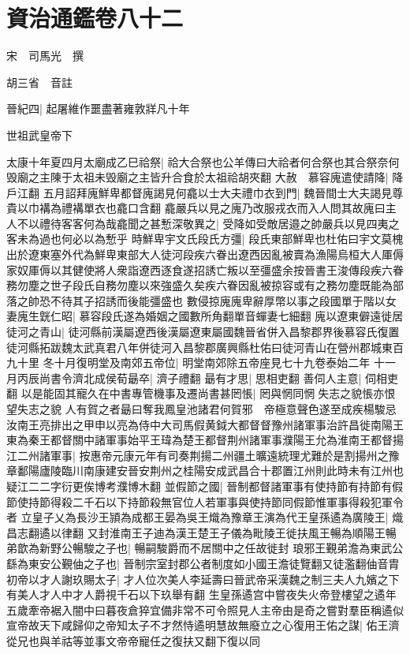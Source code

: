 \chapter{資治通鑑卷八十二}
宋　司馬光　撰

胡三省　音註

晉紀四|{
	起屠維作噩盡著雍敦牂凡十年}


世祖武皇帝下

太康十年夏四月太廟成乙巳祫祭|{
	祫大合祭也公羊傳曰大祫者何合祭也其合祭奈何毁廟之主陳于太祖未毁廟之主皆升合食於太祖祫胡夾翻}
大赦　慕容廆遣使請降|{
	降戶江翻}
五月詔拜廆鮮卑都督廆謁見何龕以士大夫禮巾衣到門|{
	魏晉間士大夫謁見尊貴以巾褠為禮褠單衣也龕口含翻}
龕嚴兵以見之廆乃改服戎衣而入人問其故廆曰主人不以禮待客客何為哉龕聞之甚慙深敬異之|{
	受降如受敵居邉之帥嚴兵以見四夷之客未為過也何必以為慙乎}
時鮮卑宇文氏段氏方彊|{
	段氏東部鮮卑也杜佑曰宇文莫槐出於遼東塞外代為鮮卑東部大人徒河段疾六眷出遼西因亂被賣為漁陽烏桓大人厙傉家奴厙傉以其健使將人衆詣遼西逐食遂招誘亡叛以至彊盛余按晉書王浚傳段疾六眷務勿塵之世子段氏自務勿塵以來強盛久矣疾六眷因亂被掠容或有之務勿塵既能為部落之帥恐不待其子招誘而後能彊盛也}
數侵掠廆廆卑辭厚幣以事之段國單于階以女妻廆生皝仁昭|{
	慕容段氏遂為婚姻之國數所角翻單音蟬妻七細翻}
廆以遼東僻遠徙居徒河之青山|{
	徒河縣前漢屬遼西後漢屬遼東屬國魏晉省併入昌黎郡界後慕容氏復置徒河縣拓跋魏太武真君八年併徒河入昌黎郡廣興縣杜佑曰徒河青山在營州郡城東百九十里}
冬十月復明堂及南郊五帝位|{
	明堂南郊除五帝座見七十九卷泰始二年}
十一月丙辰尚書令濟北成侯荀朂卒|{
	濟子禮翻}
朂有才思|{
	思相吏翻}
善伺人主意|{
	伺相吏翻}
以是能固其寵久在中書專管機事及遷尚書甚罔悵|{
	罔與惘同惘失志之貌悵亦恨望失志之貌}
人有賀之者朂曰奪我鳳皇池諸君何賀邪　帝極意聲色遂至成疾楊駿忌汝南王亮排出之甲申以亮為侍中大司馬假黄鉞大都督督豫州諸軍事治許昌徙南陽王東為秦王都督關中諸軍事始平王瑋為楚王都督荆州諸軍事濮陽王允為淮南王都督揚江二州諸軍事|{
	按惠帝元康元年有司奏荆揚二州疆土曠遠統理尤難於是割揚州之豫章鄱陽廬陵臨川南康建安晉安荆州之桂陽安成武昌合十郡置江州則此時未有江州也疑江二二字衍更俟博考濮博木翻}
並假節之國|{
	晉制都督諸軍事有使持節有持節有假節使持節得殺二千石以下持節殺無官位人若軍事與使持節同假節惟軍事得殺犯軍令者}
立皇子乂為長沙王頴為成都王晏為吳王熾為豫章王演為代王皇孫遹為廣陵王|{
	熾昌志翻遹以律翻}
又封淮南王子迪為漢王楚王子儀為毗陵王徙扶風王暢為順陽王暢弟歆為新野公暢駿之子也|{
	暢嗣駿爵而不居關中之任故徙封}
琅邪王覲弟澹為東武公繇為東安公覲伷之子也|{
	晉制宗室封郡公者制度如小國王澹徒覽翻又徒濫翻伷音胄}
初帝以才人謝玖賜太子|{
	才人位次美人李延壽曰晉武帝采漢魏之制三夫人九嬪之下有美人才人中才人爵視千石以下玖舉有翻}
生皇孫遹宫中嘗夜失火帝登樓望之遹年五歲牽帝裾入闇中曰暮夜倉猝宜備非常不可令照見人主帝由是奇之嘗對羣臣稱遹似宣帝故天下咸歸仰之帝知太子不才然恃遹明慧故無廢立之心復用王佑之謀|{
	佑王濟從兄也與羊祜等並事文帝帝寵任之復扶又翻下復以同}
